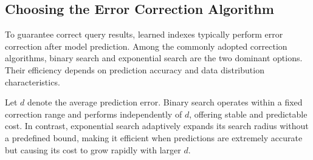 



\subsection{Choosing the Error Correction Algorithm}
\label{sec:choose-correction}
To guarantee correct query results, learned indexes typically perform error correction after model prediction. Among the commonly adopted correction algorithms, binary search and exponential search are the two dominant options. Their efficiency depends on prediction accuracy and data distribution characteristics.

Let $d$ denote the average prediction error. Binary search operates within a fixed correction range and performs independently of $d$, offering stable and predictable cost. In contrast, exponential search adaptively expands its search radius without a predefined bound, making it efficient when predictions are extremely accurate but causing its cost to grow rapidly with larger $d$.

